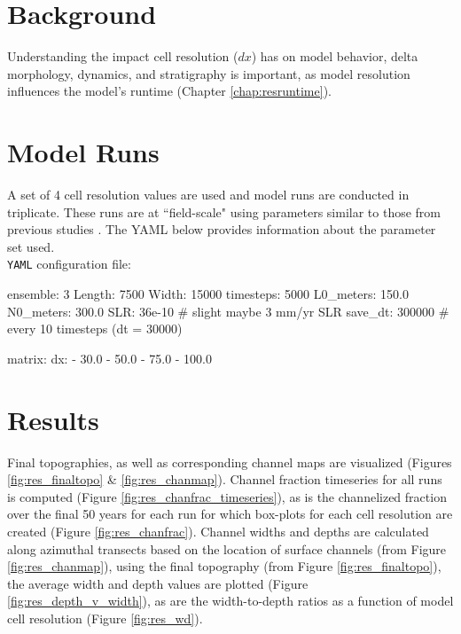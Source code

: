 \section{Background}
Understanding the impact cell resolution ($dx$) has on model behavior, delta morphology, dynamics, and stratigraphy is important, as model resolution influences the model's runtime (Chapter \ref{chap:resruntime}).

\section{Model Runs}
A set of 4 cell resolution values are used and model runs are conducted in triplicate.
These runs are at ``field-scale" using parameters similar to those from previous studies \cite{Liang2016, Liang2016a}.
The YAML below provides information about the parameter set used.\\

\noindent \texttt{YAML} configuration file: \vspace{-6pt}
\begin{boxedverbatim}
ensemble: 3
Length: 7500
Width: 15000
timesteps: 5000
L0_meters: 150.0
N0_meters: 300.0
SLR: 36e-10  # slight maybe 3 mm/yr SLR
save_dt: 300000  # every 10 timesteps (dt = 30000)

matrix:
  dx:
    - 30.0
    - 50.0
    - 75.0
    - 100.0
\end{boxedverbatim}

\section{Results}
Final topographies, as well as corresponding channel maps are visualized (Figures \ref{fig:res_finaltopo} \& \ref{fig:res_chanmap}).
Channel fraction timeseries for all runs is computed (Figure \ref{fig:res_chanfrac_timeseries}), as is the channelized fraction over the final 50 years for each run for which box-plots for each cell resolution are created (Figure \ref{fig:res_chanfrac}).
Channel widths and depths are calculated along azimuthal transects based on the location of surface channels (from Figure \ref{fig:res_chanmap}), using the final topography (from Figure \ref{fig:res_finaltopo}), the average width and depth values are plotted (Figure \ref{fig:res_depth_v_width}), as are the width-to-depth ratios as a function of model cell resolution (Figure \ref{fig:res_wd}).

